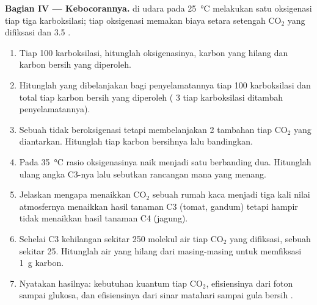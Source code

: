 \begin{problem}
\medskip
\noindent\textbf{Bagian IV --- Kebocorannya.}
 di udara pada \qty{25}{\celsius} melakukan satu oksigenasi tiap
tiga karboksilasi; tiap oksigenasi memakan biaya setara setengah
$\mathrm{CO_2}$ yang difiksasi dan 3.5 .
\begin{enumerate}[resume]
  \item Tiap 100 karboksilasi, hitunglah oksigenasinya, karbon yang
        hilang dan karbon bersih yang diperoleh.
  \item Hitunglah  yang dibelanjakan bagi penyelamatannya tiap 100
        karboksilasi dan total  tiap karbon bersih yang diperoleh
        ( 3  tiap karboksilasi ditambah penyelamatannya).
  \item Sebuah  tidak beroksigenasi tetapi membelanjakan 2
         tambahan tiap $\mathrm{CO_2}$ yang diantarkan. Hitunglah 
        tiap karbon bersihnya lalu bandingkan.
  \item Pada \qty{35}{\celsius} rasio oksigenasinya naik menjadi satu
        berbanding dua. Hitunglah ulang angka C3-nya lalu sebutkan
        rancangan mana yang menang.
  \item Jelaskan mengapa menaikkan $\mathrm{CO_2}$ sebuah rumah kaca
        menjadi tiga kali nilai atmosfernya menaikkan hasil tanaman C3
        (tomat, gandum) tetapi hampir tidak menaikkan hasil tanaman C4
        (jagung).
  \item Sehelai  C3 kehilangan sekitar 250 molekul air tiap
        $\mathrm{CO_2}$ yang difiksasi, sebuah  sekitar 25.
        Hitunglah air yang hilang dari masing-masing untuk memfiksasi
        \qty{1}{g} karbon.
  \item Nyatakan hasilnya: kebutuhan kuantum tiap $\mathrm{CO_2}$,
        efisiensinya dari foton sampai glukosa, dan efisiensinya dari
        sinar matahari sampai gula bersih .
\end{enumerate}
\end{problem}
